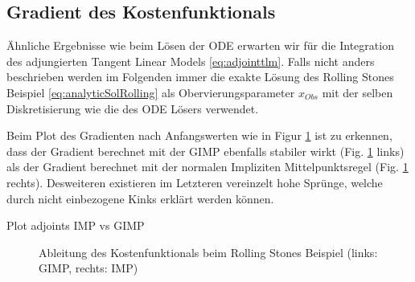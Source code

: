 \subsection{Gradient des Kostenfunktionals}
Ähnliche Ergebnisse wie beim Lösen der ODE erwarten wir für die Integration des adjungierten Tangent Linear Models \eqref{eq:adjointtlm}. Falls nicht anders beschrieben werden im Folgenden immer die exakte Lösung des Rolling Stones Beispiel \eqref{eq:analyticSolRolling} als Obervierungsparameter $x_{Obs}$ mit der selben Diskretisierung wie die des ODE Lösers verwendet.

Beim Plot des Gradienten nach Anfangswerten wie in Figur \ref{fig:rollingGrad} ist zu erkennen, dass der Gradient berechnet mit der GIMP ebenfalls stabiler wirkt (Fig. \ref{fig:rollingGrad} links) als der Gradient berechnet mit der normalen Impliziten Mittelpunktsregel (Fig. \ref{fig:rollingGrad} rechts). Desweiteren existieren im Letzteren vereinzelt hohe Sprünge, welche durch nicht einbezogene Kinks erklärt werden können. 


Plot adjoints IMP vs GIMP

\begin{figure}[H]
\centering
\begin{minipage}[b]{0.49\linewidth}

\end{minipage}
\begin{minipage}[b]{0.49\linewidth}

\end{minipage}
\begin{minipage}[b]{0.49\linewidth}

\end{minipage}
\begin{minipage}[b]{0.49\linewidth}

\end{minipage}
\caption{Ableitung des Kostenfunktionals beim Rolling Stones Beispiel (links: GIMP, rechts: IMP)}
\label{fig:rollingGrad}
\end{figure}


